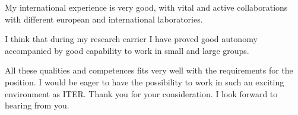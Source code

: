 \documentclass[11pt,stdletter,dateno,sigleft]{newlfm}
\begin{document}
\begin{newlfm}
My international experience is very good, with vital and active
collaborations with different european and international laboratories. 

I think that during my research carrier I have proved good autonomy
accompanied by good capability to work in small and large groups. 

All these qualities and competences fits very well with the
requirements for the position. I would be eager to have the possibility to work in such an exciting environment as ITER.
Thank you for your consideration.  I look forward to
hearing from you.

\end{newlfm}
\end{document}

